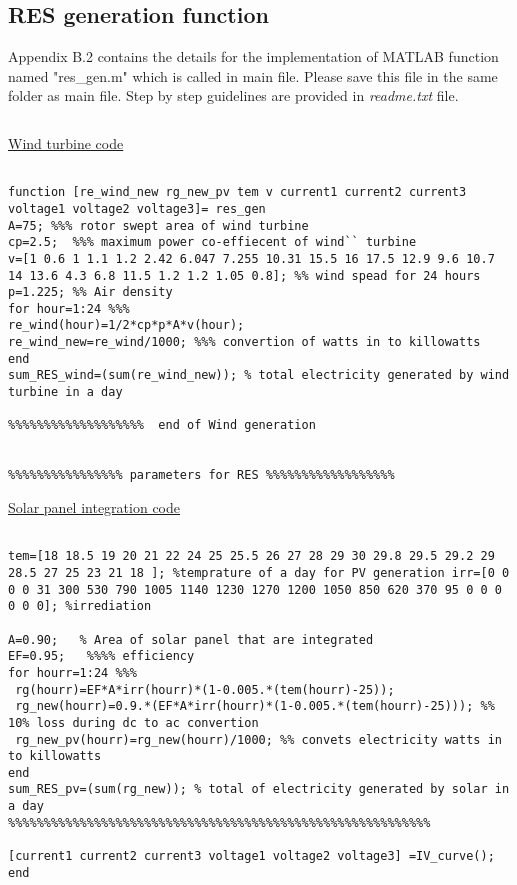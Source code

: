 \newpage
\subsection{RES generation function}
\label{resgen1}
Appendix B.2 contains the details for the implementation of MATLAB function named "res\_gen.m" which is called in main file. Please save this file in the same folder as main file. Step by step guidelines are provided in \textit{readme.txt} file.\par
\begin{linenumbers}
\begin{lstlisting}

\end{lstlisting}
\hypertarget{wt_code}{}
\hyperlink{wt_text}{Wind turbine code}
\begin{lstlisting}

function [re_wind_new rg_new_pv tem v current1 current2 current3 voltage1 voltage2 voltage3]= res_gen
A=75; %%% rotor swept area of wind turbine
cp=2.5;  %%% maximum power co-effiecent of wind`` turbine
v=[1 0.6 1 1.1 1.2 2.42 6.047 7.255 10.31 15.5 16 17.5 12.9 9.6 10.7 14 13.6 4.3 6.8 11.5 1.2 1.2 1.05 0.8]; %% wind spead for 24 hours
p=1.225; %% Air density
for hour=1:24 %%%
re_wind(hour)=1/2*cp*p*A*v(hour);
re_wind_new=re_wind/1000; %%% convertion of watts in to killowatts
end
sum_RES_wind=(sum(re_wind_new)); % total electricity generated by wind turbine in a day

%%%%%%%%%%%%%%%%%%%  end of Wind generation


%%%%%%%%%%%%%%%% parameters for RES %%%%%%%%%%%%%%%%%%
\end{lstlisting}
\hypertarget{pv_code}{}
\hyperlink{pv_text}{Solar panel integration code}
\begin{lstlisting}

tem=[18 18.5 19 20 21 22 24 25 25.5 26 27 28 29 30 29.8 29.5 29.2 29 28.5 27 25 23 21 18 ]; %temprature of a day for PV generation irr=[0 0 0 0 31 300 530 790 1005 1140 1230 1270 1200 1050 850 620 370 95 0 0 0 0 0 0]; %irrediation

A=0.90;   % Area of solar panel that are integrated
EF=0.95;   %%%% efficiency
for hourr=1:24 %%%
 rg(hourr)=EF*A*irr(hourr)*(1-0.005.*(tem(hourr)-25));
 rg_new(hourr)=0.9.*(EF*A*irr(hourr)*(1-0.005.*(tem(hourr)-25))); %% 10% loss during dc to ac convertion
 rg_new_pv(hourr)=rg_new(hourr)/1000; %% convets electricity watts in to killowatts
end
sum_RES_pv=(sum(rg_new)); % total of electricity generated by solar in a day
%%%%%%%%%%%%%%%%%%%%%%%%%%%%%%%%%%%%%%%%%%%%%%%%%%%%%%%%%%%

[current1 current2 current3 voltage1 voltage2 voltage3] =IV_curve();
end
\end{lstlisting}
\end{linenumbers} 